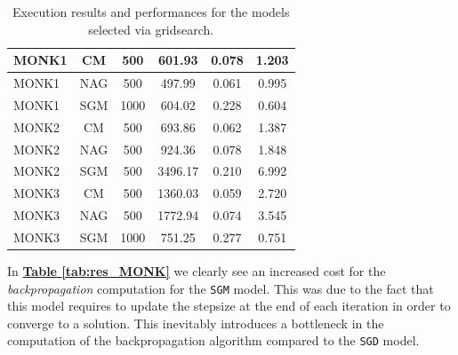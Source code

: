 \begin{table}[H]
\begin{center}
{\begin{tabular}{|P{2.cm}||c|c|c|c|c|}
         \hline\hline
         MONK1 & CM & 500 & 601.93 & 0.078 & 1.203 \\
         \hline
         MONK1 & NAG & 500 & 497.99 & 0.061 & 0.995 \\
         \hline
         MONK1 & SGM & 1000 & 604.02 & 0.228 & 0.604 \\
         \hline\hline
         MONK2 & CM & 500 & 693.86 & 0.062 & 1.387 \\
         \hline
         MONK2 & NAG & 500 & 924.36 & 0.078 & 1.848 \\
         \hline
         MONK2 & SGM & 500 & 3496.17 & 0.210 & 6.992 \\
         \hline\hline
         MONK3 & CM & 500 & 1360.03 & 0.059 & 2.720 \\
         \hline
         MONK3 & NAG & 500 & 1772.94 & 0.074 & 3.545 \\
         \hline
         MONK3 & SGM & 1000 & 751.25 & 0.277 & 0.751 \\
         \hline
    \end{tabular}}
    \label{tab:gridSGM}
    \end{center}
    \caption{Execution results and performances for the models selected via gridsearch.}
    \label{tab:stat_MONK}
\end{table}

In \hyperref[tab:res_MONK]{\textbf{Table \ref{tab:res_MONK}}} we clearly see an increased cost for the \textit{backpropagation} computation for the \texttt{SGM} model. This was due to the fact that this model requires to update the stepsize at the end of each iteration in order to converge to a solution. This inevitably introduces a bottleneck in the computation of the backpropagation algorithm compared to the \texttt{SGD} model.

